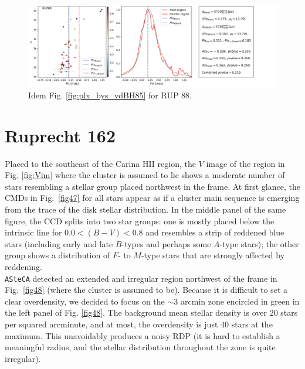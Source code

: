 \documentclass[draft]{aa}
\begin{document}
\begin{figure}[ht]
    \centering
    \includegraphics[width=\hsize]{../figs/plx_RUP88.png}
    \caption{Idem Fig. \ref{fig:plx_bys_vdBH85} for RUP 88.}
    \label{fig34}
\end{figure}





\section{Ruprecht 162}
\label{app:rup162}

Placed to the southeast of the Carina HII region, the $V$ image of the region
in Fig. \ref{fig:Vim} where the cluster is assumed to lie shows a moderate
number of stars resembling a stellar group placed northwest in the
frame. At first glance, the CMDs in Fig.~\ref{fig47} for all stars appear
as if a cluster main sequence is emerging from the trace of the disk stellar
distribution.
In the middle panel of the same figure, the CCD splits into two star groups: one is mostly placed below the intrinsic line for $0.0<(B-V)< 0.8$ and
resembles a strip of reddened blue stars (including early and late $B$-types
and perhaps some $A$-type stars); the other group shows a distribution of $F$-
to $M$-type stars that are strongly affected by reddening.\\

\texttt{ASteCA} detected an extended and irregular region northwest of
the frame in Fig.~\ref{fig48} (where the cluster is assumed to be). Because it is difficult to set a clear overdensity, we decided to focus on
the $\sim3$ arcmin zone encircled in green in the left panel of Fig. \ref{fig48}.
The background mean stellar density is over 20 stars per squared arcminute, and
at most, the overdensity is just 40 stars at the maximum. This unavoidably
produces a noisy RDP (it is hard to establish a meaningful radius, and the
stellar distribution throughout the zone is quite irregular).
\end{document}
